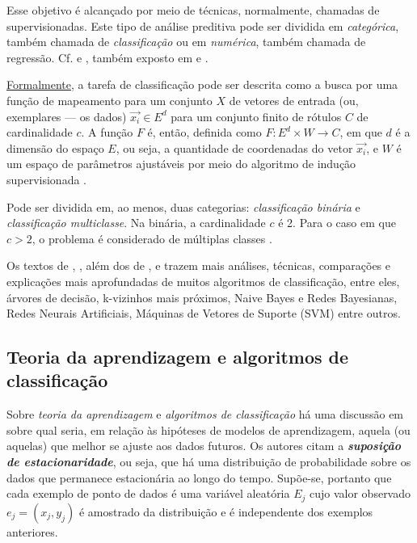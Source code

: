Esse objetivo é alcançado por meio de técnicas, normalmente, chamadas de supervisionadas. Este tipo de análise preditiva pode ser dividida em \textit{categórica}, também chamada de \textit{classificação} ou em \textit{numérica}, também chamada de regressão. Cf.   e , também exposto em  e .

\underline{Formalmente}, a tarefa de classificação pode ser descrita como a busca por uma função de mapeamento para um conjunto $X$ de vetores de entrada (ou, exemplares --- os dados) $\vec{x_i} \in E^d$ para um conjunto finito de rótulos $C$ de cardinalidade $c$. A função $F$ é, então, definida como $F: E^d \times W \rightarrow C$, em que $d$ é a dimensão do espaço $E$, ou seja, a quantidade de coordenadas do vetor $\vec{x_i}$, e $W$ é um espaço de parâmetros ajustáveis por meio do algoritmo de indução supervisionada \cite{Boscarioli2017}.

Pode ser dividida em, ao menos, duas categorias: \textit{classificação binária} e \textit{classificação multiclasse}. Na binária, a cardinalidade $c$ é 2. Para o caso em que $c > 2$, o problema é considerado de múltiplas classes \cite{Boscarioli2017} \cite{classification2013}.

Os textos de , , além dos de ,  e   trazem mais análises, técnicas, comparações e explicações mais aprofundadas de muitos algoritmos de classificação, entre eles, árvores de decisão, k-vizinhos mais próximos, Naive Bayes e Redes Bayesianas, Redes Neurais Artificiais, Máquinas de Vetores de Suporte (SVM) entre outros.   

\subsection{Teoria da aprendizagem e algoritmos de classificação }\label{sec:teoria_aprendizagem}
Sobre \textit{teoria da aprendizagem} e \textit{algoritmos de classificação} há uma discussão em  sobre qual seria, em relação às hipóteses de modelos de aprendizagem, aquela (ou aquelas) que melhor se ajuste aos dados futuros. Os autores citam a \textbf{\textit{suposição de estacionaridade}}, ou seja, que há uma distribuição de probabilidade sobre os dados que permanece estacionária ao longo do tempo. Supõe-se, portanto que cada exemplo de ponto de dados %
é uma variável aleatória $E_j$ cujo valor observado $e_j = (x_j, y_j)$ é amostrado da distribuição e é independente dos exemplos anteriores. 

